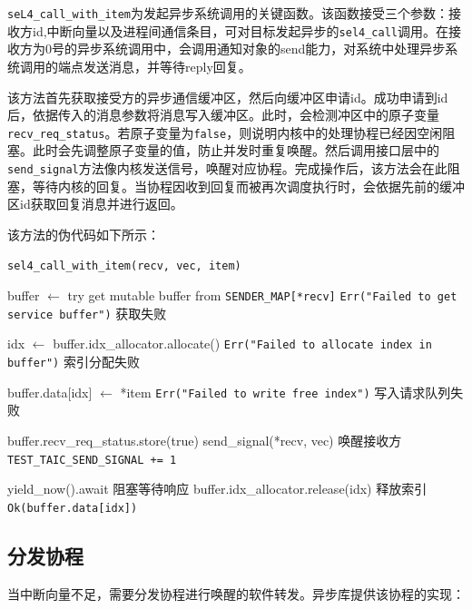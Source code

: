 \texttt{seL4\_call\_with\_item}为发起异步系统调用的关键函数。该函数接受三个参数：接收方id,中断向量以及进程间通信条目，可对目标发起异步的\texttt{sel4\_call}调用。在接收方为0号的异步系统调用中，会调用通知对象的send能力，对系统中处理异步系统调用的端点发送消息，并等待reply回复。

该方法首先获取接受方的异步通信缓冲区，然后向缓冲区申请id。成功申请到id后，依据传入的消息参数将消息写入缓冲区。此时，会检测冲区中的原子变量\texttt{recv\_req\_status}。若原子变量为\texttt{false}，则说明内核中的处理协程已经因空闲阻塞。此时会先调整原子变量的值，防止并发时重复唤醒。然后调用接口层中的\texttt{send\_signal}方法像内核发送信号，唤醒对应协程。完成操作后，该方法会在此阻塞，等待内核的回复。当协程因收到回复而被再次调度执行时，会依据先前的缓冲区id获取回复消息并进行返回。

该方法的伪代码如下所示：

\begin{algorithm}
  \caption{\texttt{sel4\_call\_with\_item(recv, vec, item)}}
  \begin{algorithmic}[0]  %
    \State buffer $\gets$ try get mutable buffer from \texttt{SENDER\_MAP[*recv]}
    \State \Return \texttt{Err("Failed to get service buffer")} \Comment 获取失败
    \EndIf

    \State idx $\gets$ buffer.idx\_allocator.allocate()
    \State \Return \texttt{Err("Failed to allocate index in buffer")} \Comment 索引分配失败
    \EndIf

    \State buffer.data[idx] $\gets$ *item
    \State \Return \texttt{Err("Failed to write free index")} \Comment 写入请求队列失败
    \EndIf

    \State buffer.recv\_req\_status.store(true)
    \State send\_signal(*recv, vec) \Comment 唤醒接收方
    \State \texttt{TEST\_TAIC\_SEND\_SIGNAL += 1}
    \EndIf

    \State yield\_now().await \Comment 阻塞等待响应
    \State buffer.idx\_allocator.release(idx) \Comment 释放索引
    \State \Return \texttt{Ok(buffer.data[idx])}
  \end{algorithmic}
\end{algorithm}

\subsection{分发协程}
当中断向量不足，需要分发协程进行唤醒的软件转发。异步库提供该协程的实现：

